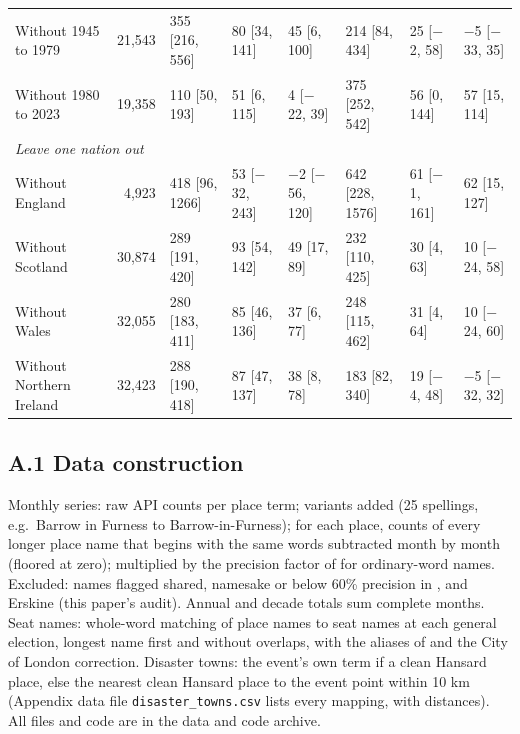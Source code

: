\documentclass[11pt,a4paper]{article}
\begin{document}
\begin{table}[p]
{\begin{tabular}{p{4.4cm}rllllll}
\quad Without 1945 to 1979 & 21,543 & 355 [216, 556] & 80 [34, 141] & 45 [6, 100] & 214 [84, 434] & 25 [$-$2, 58] & $-$5 [$-$33, 35]\\
\quad Without 1980 to 2023 & 19,358 & 110 [50, 193] & 51 [6, 115] & 4 [$-$22, 39] & 375 [252, 542] & 56 [0, 144] & 57 [15, 114]\\
\multicolumn{8}{l}{\textit{Leave one nation out}}\\
\quad Without England & 4,923 & 418 [96, 1266] & 53 [$-$32, 243] & $-$2 [$-$56, 120] & 642 [228, 1576] & 61 [$-$1, 161] & 62 [15, 127]\\
\quad Without Scotland & 30,874 & 289 [191, 420] & 93 [54, 142] & 49 [17, 89] & 232 [110, 425] & 30 [4, 63] & 10 [$-$24, 58]\\
\quad Without Wales & 32,055 & 280 [183, 411] & 85 [46, 136] & 37 [6, 77] & 248 [115, 462] & 31 [4, 64] & 10 [$-$24, 60]\\
\quad Without Northern Ireland & 32,423 & 288 [190, 418] & 87 [47, 137] & 38 [8, 78] & 183 [82, 340] & 19 [$-$4, 48] & $-$5 [$-$32, 32]\\
\bottomrule\end{tabular}}\end{table}

\subsection*{A.1 Data construction}
Monthly series: raw API counts per place term; variants added (25 spellings, e.g.\ Barrow in Furness to Barrow-in-Furness); for each place, counts of every longer place name that begins with the same words subtracted month by month (floored at zero); multiplied by the precision factor of \citet{hotham2026a} for ordinary-word names. Excluded: names flagged shared, namesake or below 60\% precision in \citet{hotham2026a}, and Erskine (this paper's audit). Annual and decade totals sum complete months. Seat names: whole-word matching of place names to seat names at each general election, longest name first and without overlaps, with the aliases of \citet{hotham2026c} and the City of London correction. Disaster towns: the event's own term if a clean Hansard place, else the nearest clean Hansard place to the event point within 10 km (Appendix data file \texttt{disaster\_towns.csv} lists every mapping, with distances). All files and code are in the data and code archive.
\end{document}
